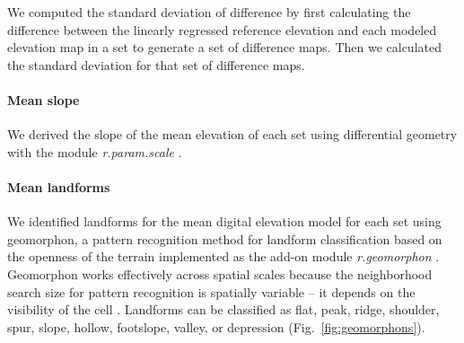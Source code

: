 \documentclass[prodmode,acmtochi]{acmsmall} %
\begin{document}
We computed the standard deviation of difference
by first calculating the difference 
between the linearly regressed reference elevation and 
each modeled elevation map in a set
to generate a set of difference maps.
Then we calculated the standard deviation 
for that set of difference maps.

%
%
%
%
%
%
%

\paragraph{Mean slope}
We derived the slope of the mean elevation of each set %
using differential geometry
\cite{Wood1996} 
with the module \textit{r.param.scale} \cite{r.param.scale}.

\paragraph{Mean landforms}
We identified landforms 
for the mean digital elevation model for each set 
using geomorphon,
a pattern recognition method for landform classification 
based on the openness of the terrain
implemented as the add-on module \textit{r.geomorphon} \cite{r.geomorphon}.
Geomorphon works effectively across spatial scales because 
the neighborhood search size for pattern recognition 
is spatially variable -- it depends on the visibility of the cell \cite{Jasiewicz2013}.  
Landforms can be classified as flat, peak, ridge, shoulder, spur, slope, hollow, footslope, valley, or depression (Fig.~\ref{fig:geomorphons}).
\end{document}
